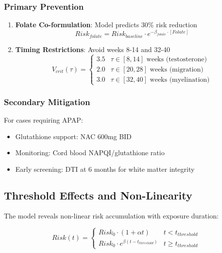 \documentclass[11pt]{article}
\let\oldsubsection\subsection
\renewcommand{\subsection}[1]{\oldsubsection{#1}\setlength{\leftskip}{0.75em}}
\let\oldsubsubsection\subsubsection
\renewcommand{\subsubsection}[1]{\oldsubsubsection{#1}\setlength{\leftskip}{1.5em}}
\begin{document}
\subsubsection{Primary Prevention}
\begin{enumerate}
\item \textbf{Folate Co-formulation}: Model predicts 30\% risk reduction
   \begin{equation}
   Risk_{folate} = Risk_{baseline} \cdot e^{-\beta_{folate} \cdot [Folate]}
   \end{equation}
   
\item \textbf{Timing Restrictions}: Avoid weeks 8-14 and 32-40
   \begin{equation}
   V_{crit}(\tau) = \begin{cases}
   3.5 & \tau \in [8,14] \text{ weeks (testosterone)} \\
   2.0 & \tau \in [20,28] \text{ weeks (migration)} \\
   3.0 & \tau \in [32,40] \text{ weeks (myelination)}
   \end{cases}
   \end{equation}
\end{enumerate}

\subsubsection{Secondary Mitigation}
For cases requiring APAP:
\begin{itemize}
\item Glutathione support: NAC 600mg BID
\item Monitoring: Cord blood NAPQI/glutathione ratio
\item Early screening: DTI at 6 months for white matter integrity
\end{itemize}

\subsection{Threshold Effects and Non-Linearity}

The model reveals non-linear risk accumulation with exposure duration:

\begin{equation}
Risk(t) = \begin{cases}
Risk_0 \cdot (1 + \alpha t) & t < t_{threshold} \\
Risk_0 \cdot e^{\beta(t - t_{threshold})} & t \geq t_{threshold}
\end{cases}
\end{equation}
\end{document}
